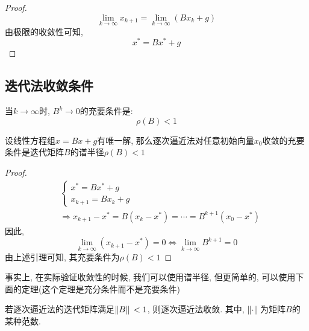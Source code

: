 \begin{proof}
    \begin{equation*}
        \lim\limits_{k\to\infty}x_{k+1}=\lim\limits_{k\to\infty}(Bx_k+g)
    \end{equation*}
    由极限的收敛性可知,
    \begin{equation*}
        x^*=Bx^*+g
    \end{equation*}
\end{proof}

\subsection{迭代法收敛条件}

\begin{lemma}
    当$k\to\infty$时, $B^k\to0$的充要条件是:
    \begin{equation*}
        \rho(B)<1
    \end{equation*}
\end{lemma}

\begin{theorem}
    设线性方程组$x=Bx+g$有唯一解, 那么逐次逼近法对任意初始向量$x_0$收敛的充要条件是迭代矩阵$B$的谱半径$\rho(B)<1$
\end{theorem}

\begin{proof}
    \begin{align*}
        &\begin{cases}
            x^*=Bx^*+g\\
            x_{k+1}=Bx_k+g
        \end{cases}\\
        &\Rightarrow x_{k+1}-x^*=B(x_k-x^*)=\cdots=B^{k+1}(x_0-x^*)
    \end{align*}
    因此, 
    \begin{equation*}
        \lim\limits_{k\to\infty}(x_{k+1}-x^*)=0\Leftrightarrow\lim\limits_{k\to\infty}B^{k+1}=0
    \end{equation*}
    由上述引理可知, 其充要条件为$\rho(B)<1$
\end{proof}

事实上, 在实际验证收敛性的时候, 我们可以使用谱半径, 但更简单的, 可以使用下面的定理(这个定理是充分条件而不是充要条件)

\begin{theorem}
    若逐次逼近法的迭代矩阵满足$\norm*{B}<1$, 则逐次逼近法收敛. 其中, $\norm*{\cdot}$为矩阵$B$的某种范数.
\end{theorem}

